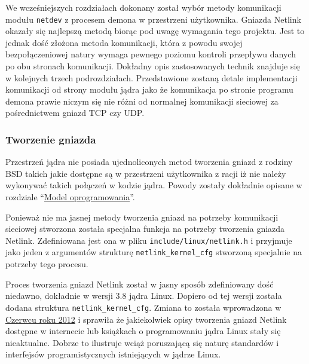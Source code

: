 
We wcześniejszych rozdziałach dokonany został wybór metody komunikacji
modułu \texttt{netdev} z procesem demona w przestrzeni użytkownika.
Gniazda Netlink okazały się najlepszą metodą biorąc pod uwagę wymagania
tego projektu. Jest to jednak dość złożona metoda komunikacji, która z
powodu swojej bezpołączeniowej natury wymaga pewnego poziomu kontroli
przepływu danych po obu stronach komunikacji. Dokładny opis
zastosowanych technik znajduje się w kolejnych trzech podrozdziałach.
Przedstawione zostaną detale implementacji komunikacji od strony modułu
jądra jako że komunikacja po stronie programu demona prawie niczym się
nie różni od normalnej komunikacji sieciowej za pośrednictwem gniazd TCP
czy UDP.

\subsubsection{Tworzenie gniazda}

Przestrzeń jądra nie posiada ujednoliconych metod tworzenia gniazd z
rodziny BSD takich jakie dostępne są w przestrzeni użytkownika z racji
iż nie należy wykonywać takich połączeń w kodzie jądra. Powody zostały
dokładnie opisane w rozdziale ``\hyperref[model-oprogramowania]{Model
oprogramowania}''.

Ponieważ nie ma jasnej metody tworzenia gniazd na potrzeby komunikacji
sieciowej stworzona została specjalna funkcja na potrzeby tworzenia
gniazda Netlink. Zdefiniowana jest ona w pliku
\texttt{include/linux/netlink.h} i przyjmuje jako jeden z argumentów
strukturę \texttt{netlink\_kernel\_cfg} stworzoną specjalnie na potrzeby
tego procesu.

Proces tworzenia gniazd Netlink został w jasny sposób zdefiniowany dość
niedawno, dokładnie w wersji 3.8 jądra Linux. Dopiero od tej wersji
została dodana struktura \texttt{netlink\_kernel\_cfg}. Zmiana to
została wprowadzona w
\href{http://www.spinics.net/lists/netfilter-devel/msg22338.html}{Czerwcu
roku 2012} i sprawiła że jakiekolwiek opisy tworzenia gniazd Netlink
dostępne w internecie lub książkach o programowaniu jądra Linux stały
się nieaktualne. Dobrze to ilustruje wciąż poruszającą się naturę
standardów i interfejsów programistycznych istniejących w jądrze Linux.

